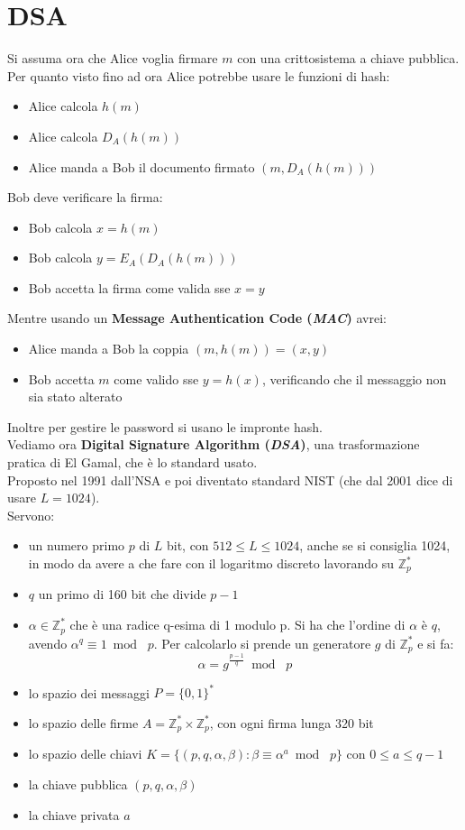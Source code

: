 \documentclass[a4paper,12pt, oneside]{book}
\begin{document}
\section{DSA}
Si assuma ora che Alice voglia firmare $m$ con una crittosistema a chiave
pubblica. Per quanto visto fino ad ora Alice potrebbe usare le funzioni di hash:
\begin{itemize}
  \item Alice calcola $h(m)$
  \item Alice calcola $D_A(h(m))$
  \item Alice manda a Bob il documento firmato $(m,D_A(h(m)))$
\end{itemize}
Bob deve verificare la firma:
\begin{itemize}
  \item Bob calcola $x=h(m)$
  \item Bob calcola $y=E_A(D_A(h(m)))$
  \item Bob accetta la firma come valida sse $x=y$
\end{itemize}
Mentre usando un \textbf{Message Authentication Code (\textit{MAC})} avrei:
\begin{itemize}
  \item Alice manda a Bob la coppia $(m, h(m))=(x,y)$
  \item Bob accetta $m$ come valido sse $y=h(x)$, verificando che il messaggio
  non sia stato alterato
\end{itemize}
Inoltre per gestire le password si usano le impronte hash.\\
Vediamo ora \textbf{Digital Signature Algorithm (\textit{DSA})}, una
trasformazione pratica di El Gamal, che è lo standard usato.\\
Proposto nel 1991 dall'NSA e poi diventato standard NIST (che dal 2001 dice di
usare $L=1024$).\\
Servono:
\begin{itemize}
  \item un numero primo $p$ di $L$ bit, con $512\leq L\leq 1024$, anche se si
  consiglia 1024, in modo da avere a che fare con il logaritmo discreto
  lavorando su $\mathbb{Z}_p^*$
  \item $q$ un primo di 160 bit che divide $p-1$
  \item $\alpha\in\mathbb{Z}_p^*$ che è una radice q-esima di 1 modulo p. Si ha
  che l'ordine di $\alpha$ è $q$, avendo $\alpha^q\equiv 1\bmod\,\,p$. Per
  calcolarlo si prende un generatore $g$ di $\mathbb{Z}_p^*$ e si fa:
  \[\alpha=g^{\frac{p-1}{q}}\bmod\,\,p\]
  \item lo spazio dei messaggi $P=\{0,1\}^*$
  \item lo spazio delle firme $A=\mathbb{Z}_p^*\times \mathbb{Z}_p^*$, con ogni
  firma lunga 320 bit
  \item lo spazio delle chiavi
  $K=\{(p,q,\alpha,\beta):\beta\equiv\alpha^a\bmod\,\,p\}$ con $0\leq a \leq
  q-1$ 
  \item la chiave pubblica $(p,q,\alpha,\beta)$
  \item la chiave privata $a$
\end{itemize}
\end{document}
